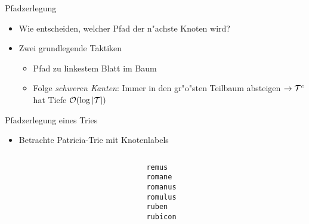 \documentclass[ngerman,hyperref={pdfpagelabels=true}]{beamer}
\begin{document}
\begin{frame}{Pfadzerlegung}
\begin{itemize}
\item Wie entscheiden, welcher Pfad der n"achste Knoten wird?
\item Zwei grundlegende Taktiken
\begin{itemize}
\item Pfad zu linkestem Blatt im Baum
\item Folge \emph{schweren Kanten}: Immer in den gr"o"sten Teilbaum absteigen
$\rightarrow \mathcal{T}^c$ hat Tiefe $\mathcal{O}(\log |\mathcal{T}|)$
\end{itemize}
\end{itemize}
\end{frame}

\newcommand{\edgelabel}[2]{edge from parent node[draw=none,#1]{\lstinline|#2|}}

\begin{frame}{Pfadzerlegung eines Tries}
\begin{itemize}
\item Betrachte Patricia-Trie mit Knotenlabels
\end{itemize}

\begin{columns}[T] %
\begin{column}{.48\textwidth}

\centering


\end{column}%
\hfill%
\begin{column}{.48\textwidth}



\lstinline|remus| \\
\lstinline|romane| \\
\lstinline|romanus| \\
\lstinline|romulus| \\
\lstinline|ruben| \\
\lstinline|rubicon| \\

\end{column}
\end{columns}

\end{frame}
\end{document}
